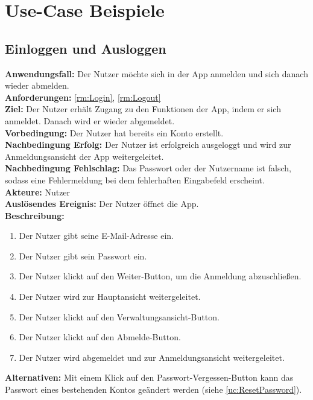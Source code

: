 \documentclass[parskip=full]{scrartcl}
\newcommand{\changelocaltocdepth}[1]{%
  \addtocontents{toc}{\protect\setcounter{tocdepth}{#1}}%
  \setcounter{tocdepth}{#1}%
}
\newcommand{\enablesubsectionnumbering}[1]{
    \renewcommand{\thesubsection}{$\langle$#1\arabic{subsection}0$\rangle$}
    \changelocaltocdepth{1} 
}
\begin{document}
\section{Use-Case Beispiele}
\enablesubsectionnumbering{UC}

\subsection{Einloggen und Ausloggen}
\label{uc:LoginLogout}
\textbf{Anwendungsfall:} Der Nutzer möchte sich in der App anmelden und sich danach wieder abmelden.\\
\textbf{Anforderungen:} \ref{rm:Login}, \ref{rm:Logout}\\
\textbf{Ziel:} Der Nutzer erhält Zugang zu den Funktionen der App, indem er sich anmeldet. Danach wird er wieder abgemeldet.\\
\textbf{Vorbedingung:} Der Nutzer hat bereits ein Konto erstellt.\\
\textbf{Nachbedingung Erfolg:} Der Nutzer ist erfolgreich ausgeloggt und wird zur Anmeldungsansicht der App weitergeleitet.\\
\textbf{Nachbedingung Fehlschlag:} Das Passwort oder der Nutzername ist falsch, sodass eine Fehlermeldung bei dem fehlerhaften Eingabefeld erscheint.\\
\textbf{Akteure:} Nutzer\\
\textbf{Auslösendes Ereignis:} Der Nutzer öffnet die App.\\
\textbf{Beschreibung:}
\begin{enumerate}
    \item Der Nutzer gibt seine E-Mail-Adresse ein.
    \item Der Nutzer gibt sein Passwort ein.
    \item Der Nutzer klickt auf den Weiter-Button, um die Anmeldung abzuschließen.
    \item Der Nutzer wird zur Hauptansicht weitergeleitet.
    \item Der Nutzer klickt auf den Verwaltungsansicht-Button.
    \item Der Nutzer klickt auf den Abmelde-Button.
    \item Der Nutzer wird abgemeldet und zur Anmeldungsansicht weitergeleitet.
\end{enumerate}
\textbf{Alternativen:} Mit einem Klick auf den Passwort-Vergessen-Button kann das Passwort eines bestehenden Kontos geändert werden (siehe \ref{uc:ResetPassword}).
\newpage
\end{document}
